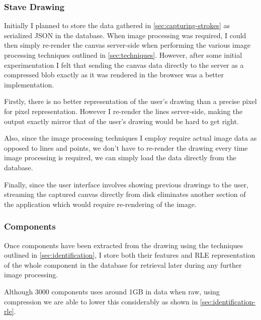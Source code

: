 \subsubsection{Stave Drawing}
Initially I planned to store the data gathered in \cref{sec:capturing-strokes} as serialized JSON in the database. When image processing was required, I could then simply re-render the canvas server-side when performing the various image processing techniques outlined in \cref{sec:techniques}. However, after some initial experimentation I felt that sending the canvas data directly to the server as a compressed blob exactly as it was rendered in the browser was a better implementation.

Firstly, there is no better representation of the user's drawing than a precise pixel for pixel representation. However I re-render the lines server-side, making the output exactly mirror that of the user's drawing would be hard to get right.

Also, since the image processing techniques I employ require actual image data as opposed to lines and points, we don't have to re-render the drawing every time image processing is required, we can simply load the data directly from the database.

Finally, since the user interface involves showing previous drawings to the user, streaming the captured canvas directly from disk eliminates another section of the application which would require re-rendering of the image.


\subsubsection{Components}

Once components have been extracted from the drawing using the techniques outlined in \cref{sec:identification}, I store both their features and \acrfull{RLE} representation of the whole component in the database for retrieval later during any further image processing.

Although 3000 components uses around 1GB in data when raw, using compression we are able to lower this considerably as shown in \ref{sec:identification-rle}.


